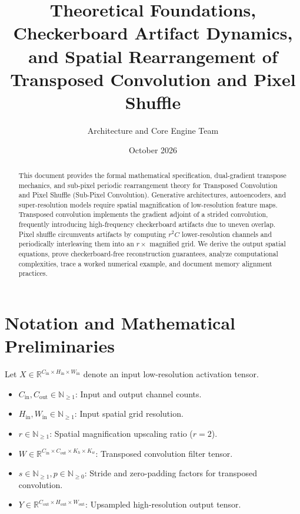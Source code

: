 \documentclass[11pt,a4paper]{article}
\title{\textbf{Theoretical Foundations, Checkerboard Artifact Dynamics, and Spatial Rearrangement of Transposed Convolution and Pixel Shuffle}}
\author{Architecture and Core Engine Team}
\date{October 2026}
\theoremstyle{definition}
\begin{document}
\maketitle

\begin{abstract}
This document provides the formal mathematical specification, dual-gradient transpose mechanics, and sub-pixel periodic rearrangement theory for Transposed Convolution and Pixel Shuffle (Sub-Pixel Convolution). Generative architectures, autoencoders, and super-resolution models require spatial magnification of low-resolution feature maps. Transposed convolution implements the gradient adjoint of a strided convolution, frequently introducing high-frequency checkerboard artifacts due to uneven overlap. Pixel shuffle circumvents artifacts by computing $r^2 C$ lower-resolution channels and periodically interleaving them into an $r\times$ magnified grid. We derive the output spatial equations, prove checkerboard-free reconstruction guarantees, analyze computational complexities, trace a worked numerical example, and document memory alignment practices.
\end{abstract}

\section{Notation and Mathematical Preliminaries}

Let $X \in \mathbb{R}^{C_{\text{in}} \times H_{\text{in}} \times W_{\text{in}}}$ denote an input low-resolution activation tensor.

\begin{itemize}
    \item $C_{\text{in}}, C_{\text{out}} \in \mathbb{N}_{\ge 1}$: Input and output channel counts.
    \item $H_{\text{in}}, W_{\text{in}} \in \mathbb{N}_{\ge 1}$: Input spatial grid resolution.
    \item $r \in \mathbb{N}_{\ge 1}$: Spatial magnification upscaling ratio ($r = 2$).
    \item $W \in \mathbb{R}^{C_{\text{in}} \times C_{\text{out}} \times K_h \times K_w}$: Transposed convolution filter tensor.
    \item $s \in \mathbb{N}_{\ge 1}, p \in \mathbb{N}_{\ge 0}$: Stride and zero-padding factors for transposed convolution.
    \item $Y \in \mathbb{R}^{C_{\text{out}} \times H_{\text{out}} \times W_{\text{out}}}$: Upsampled high-resolution output tensor.
\end{itemize}
\end{document}
